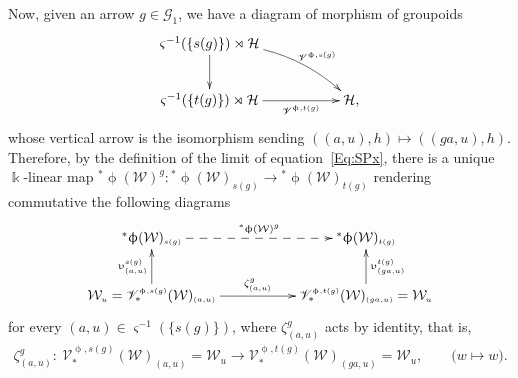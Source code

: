 \documentclass[pdftex]{sigma}
\numberwithin{equation}{section}
\newcommand{\Ga}{\cG_{\Sscript{1}}}
\newcommand{\vV}{\mathscr{V}}
\newcommand{\cG}{{\mathcal G}}
\newcommand{\cH}{{\mathcal H}}
\newcommand{\cW}{{\mathcal W}}
\newcommand{\Sscript}[1]{\scriptscriptstyle{#1}}
\newcommand{\pls}{{}^{*}\upphi}
\begin{document}
Now, given an arrow $g \in \Ga$, we have a diagram of morphism of groupoids
\begin{gather*}
\xymatrix{ \varsigma^{-1}(\{s(g)\}) \rJoin \cH \ar@{->}^-{}[d]
\ar@{->}@/^1pc/^-{\vV^{\Sscript{\upphi, s(g)}}}[drr] & & \\
\varsigma^{-1}(\{t(g)\}) \rJoin \cH \ar@{->}_-{\vV^{\Sscript{\upphi, t(g)}}}[rr] & & \cH, }
\end{gather*}
whose vertical arrow is the isomorphism sending $((a,u), h) \mapsto ( (ga,u),h)$. Therefore, by the definition of the limit of equation~\eqref{Eq:SPx}, there is a unique $\Bbbk$-linear map
${}^*\upphi(\cW)^{\Sscript{g}}\colon {}^*\upphi(\cW)_{\Sscript{s(g)}} \to {}^*\upphi(\cW)_{\Sscript{t(g)}}$ rendering commutative the following diagrams
\begin{gather}\label{Eq:lphiup}
\begin{gathered}
\xymatrix@R=25pt{ \pls(\cW)_{\Sscript{s(g)}}
\ar@{-->}^-{\pls(\cW)^g}[rr] & & \pls(\cW)_{\Sscript{t(g)}} \\
\cW_{\Sscript{u}}=\vV^{\Sscript{\upphi,
s(g)}}_*(\cW)_{\Sscript{(a, u)}}
\ar@{->}^-{\upupsilon^{\Sscript{s(g)}}_{\Sscript{(a, u)}}}[u]
\ar@{->}^-{\zeta^g_{(a, u)}}[rr] & &
\ar@{->}_-{\upupsilon^{\Sscript{t(g)}}_{\Sscript{(ga, u)}}}[u]
\vV^{\Sscript{\upphi, t(g)}}_*(\cW)_{\Sscript{(ga, u)}}
=\cW_{\Sscript{u}} }
\end{gathered}
\end{gather}
for every $(a,u) \in \varsigma^{-1}(\{s(g)\})$, where $\zeta^g_{(a, u)}$ acts by identity, that is,
\begin{gather*}
\zeta^g_{(a, u)}\colon \ \vV^{\Sscript{\upphi, s(g)}}_*(\cW)_{\Sscript{(a, u)}}=\cW_{\Sscript{u}}\longrightarrow \vV^{\Sscript{\upphi,t(g)}}_*(\cW)_{\Sscript{(ga, u)}}=\cW_{\Sscript{u}}, \qquad \big(w \longmapsto w \big).
\end{gather*}
\end{document}

